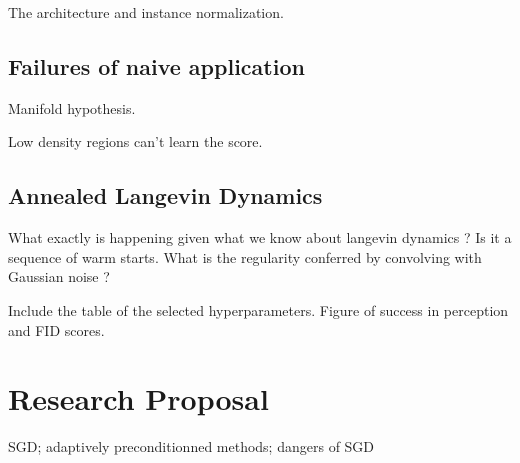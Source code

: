 \documentclass[11pt,twoside]{article}
\begin{document}
The architecture and instance normalization.

\subsection{Failures of naive application}

Manifold hypothesis.

Low density regions can't learn the score.

\subsection{Annealed Langevin Dynamics}

What exactly is happening given what we know about langevin dynamics ? Is it a sequence of warm starts. What is the regularity conferred by convolving with Gaussian noise ?

Include the table of the selected hyperparameters. 
Figure of success in perception and FID scores.

\section{Research Proposal}
SGD; adaptively preconditionned methods; dangers of SGD
\end{document}
